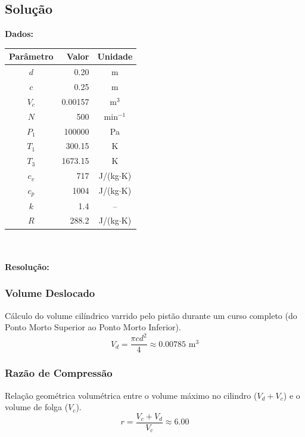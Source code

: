 \subsection*{Solução}
\noindent\textbf{Dados:}\\[5pt]
\begin{center}
\begin{tabular}{|c|r|c|} \hline
\textbf{Parâmetro} & \textbf{Valor} & \textbf{Unidade} \\ \hline\hline
$d$ & 0.20 & m \\ \hline
$c$ & 0.25 & m \\ \hline
$V_c$ & 0.00157 & m$^3$ \\ \hline
$N$ & 500 & min$^{-1}$ \\ \hline
$P_1$ & 100000 & Pa \\ \hline
$T_1$ & 300.15 & K \\ \hline
$T_3$ & 1673.15 & K \\ \hline
$c_v$ & 717 & J/(kg$\cdot$K) \\ \hline
$c_p$ & 1004 & J/(kg$\cdot$K) \\ \hline
$k$ & 1.4 & -- \\ \hline
$R$ & 288.2 & J/(kg$\cdot$K) \\ \hline
\end{tabular}
\end{center}\\[10pt]

\paragraph{Resolução:}

\subsubsection*{Volume Deslocado}
\noindent Cálculo do volume cilíndrico varrido pelo pistão durante um curso completo (do Ponto Morto Superior ao Ponto Morto Inferior).
\[ V_d = \frac{\pi c d^{2}}{4} \approx 0.00785 \text{ m}^3 \]
\vspace{6pt}

\subsubsection*{Razão de Compressão}
\noindent Relação geométrica volumétrica entre o volume máximo no cilindro ($V_d + V_c$) e o volume de folga ($V_c$).
\[ r = \frac{V_c + V_d}{V_c} \approx 6.00 \]
\vspace{6pt}


